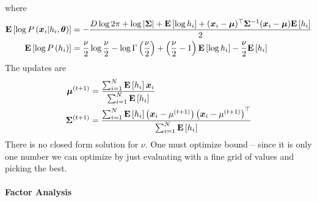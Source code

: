 where
\begin{align*}
	\mathbf{E}\left[\log P\left(\boldsymbol{x}_i|h_i,\boldsymbol{\theta}\right)\right]&=-\frac{D\log 2\pi+\log\left\vert \mathbf{\Sigma} \right\vert+\mathbf{E}\left[\log h_i\right]+(\boldsymbol{x}_i-\boldsymbol{\mu})^\top\mathbf{\Sigma}^{-1}(\boldsymbol{x}_i-\boldsymbol{\mu})\mathbf{E}\left[h_i\right]}{2} \\
	\mathbf{E}\left[\log P\left(h_i\right)\right]&=\frac{\nu}{2}\log\frac{\nu}{2}-\log\Gamma\left(\frac{\nu}{2}\right)+\left(\frac{\nu}{2}-1\right)\mathbf{E}\left[\log h_i\right]-\frac{\nu}{2}\mathbf{E}\left[h_i\right]
\end{align*}
The updates are
\begin{align*}
	\boldsymbol{\mu}^{(t+1)}&=\frac{\sum_{i=1}^N\mathbf{E}\left[h_i\right]\boldsymbol{x}_i}{\sum_{i=1}^N\mathbf{E}\left[h_i\right]} \\
	\mathbf{\Sigma}^{(t+1)}&=\frac{\sum_{i=1}^N\mathbf{E}\left[h_i\right]\left(\boldsymbol{x}_i-\mu^{(t+1)}\right)\left(\boldsymbol{x}_i-\mu^{(t+1)}\right)^\top}{\sum_{i=1}^N\mathbf{E}\left[h_i\right]}
\end{align*}
There is no closed form solution for $\nu$. One must optimize bound -- since it is only one number we can optimize by just evaluating with a fine grid of values and picking the best.

\paragraph{Factor Analysis}

